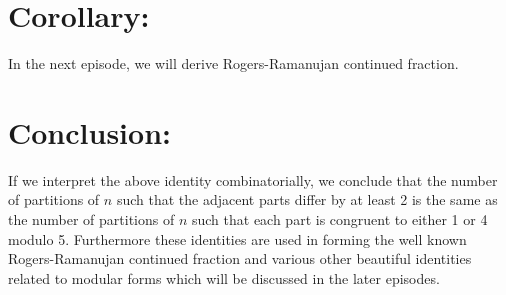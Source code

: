 \documentclass[12pt]{article}
\begin{document}
\section*{Corollary:}
In the next episode, we will derive Rogers-Ramanujan continued fraction.

\section*{Conclusion:}
If we interpret the above identity combinatorially, we conclude that the number of partitions of $n$ such that the adjacent parts differ by at least 2 is the same as the number of partitions of $n$ such that each part is congruent to either 1 or 4 modulo 5. Furthermore these identities are used in forming the well known Rogers-Ramanujan continued fraction and various other beautiful identities related to modular forms which will be discussed in the later episodes.
\end{document}
